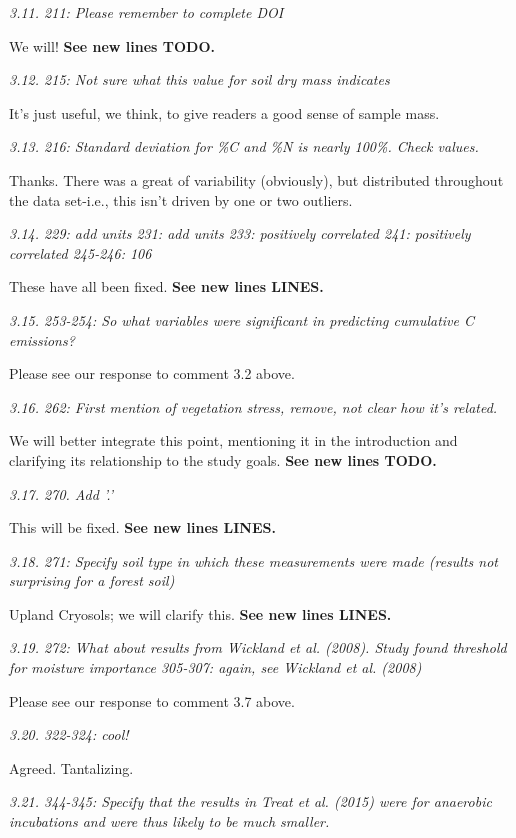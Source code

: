 \documentclass[11pt, oneside]{article}
\begin{document}
\medskip
{\it 3.11. 211: Please remember to complete DOI }

We will! {\bf See new lines TODO.}

\medskip
{\it 3.12. 215: Not sure what this value for soil dry mass indicates }

It's just useful, we think, to give readers a good sense of sample mass.

\medskip
{\it 3.13. 216: Standard deviation for \%C and \%N is nearly 100\%. Check values. }

Thanks. There was a great of variability (obviously), but distributed throughout the data set-i.e., this isn't driven by one or two outliers.

\medskip
{\it 3.14. 229: add units
231: add units
233: positively correlated
241: positively correlated
245-246: 106 }

These have all been fixed. {\bf See new lines LINES.}

\medskip
{\it 3.15. 253-254: So what variables were significant in predicting cumulative C emissions? }

Please see our response to comment 3.2 above.

\medskip
{\it 3.16. 262: First mention of vegetation stress, remove, not clear how it's related. }

We will better integrate this point, mentioning it in the introduction and clarifying its relationship to the study goals. {\bf See new lines TODO.}

\medskip
{\it 3.17. 270. Add '.' }

This will be fixed. {\bf See new lines LINES.}

\medskip
{\it 3.18. 271: Specify soil type in which these measurements were made (results not surprising for a forest soil) }

Upland Cryosols; we will clarify this. {\bf See new lines LINES.}

\medskip
{\it 3.19. 272: What about results from Wickland et al. (2008). Study found threshold for moisture importance
305-307: again, see Wickland et al. (2008) }

Please see our response to comment 3.7 above.

\medskip
{\it 3.20. 322-324: cool! }

Agreed. Tantalizing.

\medskip
{\it 3.21. 344-345: Specify that the results in Treat et al. (2015) were for anaerobic incubations and were thus likely to be much smaller. }
\end{document}
